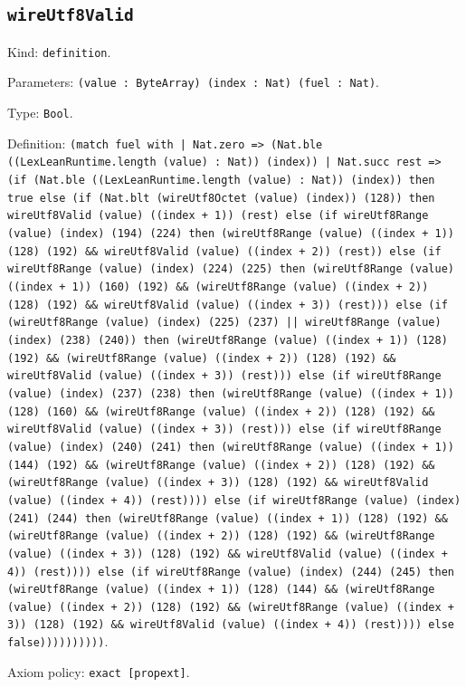 \documentclass[11pt]{article}
\begin{document}
\subsection*{\texttt{wireUtf8Valid}}
\noindent Kind: \texttt{definition}.\par
\noindent Parameters: \texttt{(value : ByteArray) (index : Nat) (fuel : Nat)}.\par
\noindent Type: \texttt{Bool}.\par
\noindent Definition: \texttt{(match fuel with | Nat.zero => (Nat.ble ((LexLeanRuntime.length (value) : Nat)) (index)) | Nat.succ rest => (if (Nat.ble ((LexLeanRuntime.length (value) : Nat)) (index)) then true else (if (Nat.blt (wireUtf8Octet (value) (index)) (128)) then wireUtf8Valid (value) ((index + 1)) (rest) else (if wireUtf8Range (value) (index) (194) (224) then (wireUtf8Range (value) ((index + 1)) (128) (192) \&\& wireUtf8Valid (value) ((index + 2)) (rest)) else (if wireUtf8Range (value) (index) (224) (225) then (wireUtf8Range (value) ((index + 1)) (160) (192) \&\& (wireUtf8Range (value) ((index + 2)) (128) (192) \&\& wireUtf8Valid (value) ((index + 3)) (rest))) else (if (wireUtf8Range (value) (index) (225) (237) || wireUtf8Range (value) (index) (238) (240)) then (wireUtf8Range (value) ((index + 1)) (128) (192) \&\& (wireUtf8Range (value) ((index + 2)) (128) (192) \&\& wireUtf8Valid (value) ((index + 3)) (rest))) else (if wireUtf8Range (value) (index) (237) (238) then (wireUtf8Range (value) ((index + 1)) (128) (160) \&\& (wireUtf8Range (value) ((index + 2)) (128) (192) \&\& wireUtf8Valid (value) ((index + 3)) (rest))) else (if wireUtf8Range (value) (index) (240) (241) then (wireUtf8Range (value) ((index + 1)) (144) (192) \&\& (wireUtf8Range (value) ((index + 2)) (128) (192) \&\& (wireUtf8Range (value) ((index + 3)) (128) (192) \&\& wireUtf8Valid (value) ((index + 4)) (rest)))) else (if wireUtf8Range (value) (index) (241) (244) then (wireUtf8Range (value) ((index + 1)) (128) (192) \&\& (wireUtf8Range (value) ((index + 2)) (128) (192) \&\& (wireUtf8Range (value) ((index + 3)) (128) (192) \&\& wireUtf8Valid (value) ((index + 4)) (rest)))) else (if wireUtf8Range (value) (index) (244) (245) then (wireUtf8Range (value) ((index + 1)) (128) (144) \&\& (wireUtf8Range (value) ((index + 2)) (128) (192) \&\& (wireUtf8Range (value) ((index + 3)) (128) (192) \&\& wireUtf8Valid (value) ((index + 4)) (rest)))) else false))))))))))}.\par
\noindent Axiom policy: \texttt{exact [propext]}.\par
\end{document}
